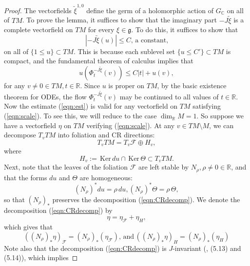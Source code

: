 \documentclass[12pt,reqno]{amsart}\usepackage{amssymb,amsmath,amscd,epsfig,amsthm,enumerate,import,eufrak}
\theoremstyle{definition}
\theoremstyle{remark}
\numberwithin{equation}{section}
\theoremstyle{plain}
\theoremstyle{definition}
\def \r {\mathbb{R}}
\def \c {\mathbb{C}}
\def \vs {\vskip 2mm}
\theoremstyle{remark}
\numberwithin{theorem}{section}
\begin{document}
\begin{proof}
The vectorfields $\tilde{\xi}^{1,0}$ define the germ of a holomorphic action of $G_{\c}$ on all of $TM$. To prove the lemma, it suffices to show that the imaginary part $- J \tilde{\xi}$ is a complete vectorfield on $TM$ for every $\xi \in \mathfrak{g}$. To do this, it suffices to show that 
%
\begin{equation}\label{eqn:est}
	|- J \tilde{\xi}(u)| \leq C, \, \text{a constant,} 
\end{equation}
%
\vs
on all of $\{ 1 \leq u\} \subset TM$. This is because each sublevel set $\{u \leq C'\} \subset TM$ is compact, and the fundamental theorem of calculus implies that
%
\[
	u(\Phi^{-J \tilde{\xi}}_t(v)) \leq C |t| + u(v),
\]
%
for any $v \neq 0 \in TM, t \in \r$. Since $u$ is proper on $TM$, by the basic existence theorem for ODEs, the flow $\Phi^{-J \tilde{\xi}}_t(v)$ may be continued to all values of $t \in \r$.
\vs
Now the estimate (\ref{eqn:est}) is valid for any vectorfield on $TM$ satisfying (\ref{eqn:scale}). To see this, we will reduce to the case $\dim_{\r} M = 1$. So suppose we have a vectorfield $\eta$ on $TM$ verifying (\ref{eqn:scale}). At any $v \in TM \setminus M$, we can decompose $T_vTM$ into foliation and CR directions: 
%
\begin{equation} \label{eqn:CRdecomp}
	T_vTM = T_v\mathcal{F} \oplus H_v,
\end{equation}
%
where
%
\begin{equation} \label{eqn:defH}
	H_v := \, \text{Ker}\, du \cap \,\text{Ker} \, \Theta \subset T_vTM.
\end{equation}
%
Next, note that the leaves of the foliation $\mathcal{F}$ are left stable by $N_{\rho}, \rho \neq 0 \in \r$, and that the forms $du$ and $\Theta$ are homogeneous:
%
\begin{equation} \label{eqn:homog}
	(N_{\rho})^* du = \rho \, du, (N_{\rho})^* \Theta = \rho \, \Theta,
\end{equation}
% 
so that $(N_{\rho})_*$ preserves the decomposition (\ref{eqn:CRdecomp}). We denote the decomposition (\ref{eqn:CRdecomp}) by
%
\[
	\eta = \eta_{\mathcal{F}} + \eta_H,
\]
%
which gives that
%
\begin{equation} \label{eqn:decompN}
	((N_{\rho})_* \eta)_{\mathcal{F}} = (N_{\rho})_*(\eta_{\mathcal{F}}), \, \text{and}\, ((N_{\rho})_*\eta)_H = (N_{\rho})_*(\eta_H)
\end{equation}
%
Note also that the decomposition (\ref{eqn:CRdecomp}) is $J$-invariant (\cite{ls}, (5.13) and (5.14)), which implies

\end{proof}
\end{document}
